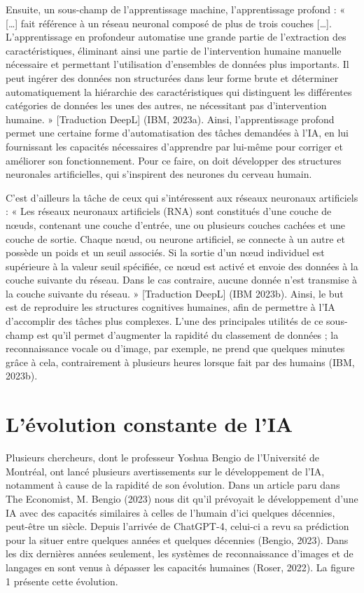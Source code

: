 \documentclass[
  letterpaper,
  DIV=11,
  numbers=noendperiod]{scrreprt}
\begin{document}
Ensuite, un sous-champ de l'apprentissage machine, l'apprentissage
profond : « {[}\ldots{]} fait référence à un réseau neuronal composé de
plus de trois couches {[}\ldots{]}. L'apprentissage en profondeur
automatise une grande partie de l'extraction des caractéristiques,
éliminant ainsi une partie de l'intervention humaine manuelle nécessaire
et permettant l'utilisation d'ensembles de données plus importants. Il
peut ingérer des données non structurées dans leur forme brute et
déterminer automatiquement la hiérarchie des caractéristiques qui
distinguent les différentes catégories de données les unes des autres,
ne nécessitant pas d'intervention humaine. » {[}Traduction DeepL{]}
(IBM, 2023a). Ainsi, l'apprentissage profond permet une certaine forme
d'automatisation des tâches demandées à l'IA, en lui fournissant les
capacités nécessaires d'apprendre par lui-même pour corriger et
améliorer son fonctionnement. Pour ce faire, on doit développer des
structures neuronales artificielles, qui s'inspirent des neurones du
cerveau humain.

C'est d'ailleurs la tâche de ceux qui s'intéressent aux réseaux
neuronaux artificiels : « Les réseaux neuronaux artificiels (RNA) sont
constitués d'une couche de nœuds, contenant une couche d'entrée, une ou
plusieurs couches cachées et une couche de sortie. Chaque nœud, ou
neurone artificiel, se connecte à un autre et possède un poids et un
seuil associés. Si la sortie d'un nœud individuel est supérieure à la
valeur seuil spécifiée, ce nœud est activé et envoie des données à la
couche suivante du réseau. Dans le cas contraire, aucune donnée n'est
transmise à la couche suivante du réseau. » {[}Traduction DeepL{]} (IBM
2023b). Ainsi, le but est de reproduire les structures cognitives
humaines, afin de permettre à l'IA d'accomplir des tâches plus
complexes. L'une des principales utilités de ce sous-champ est qu'il
permet d'augmenter la rapidité du classement de données ; la
reconnaissance vocale ou d'image, par exemple, ne prend que quelques
minutes grâce à cela, contrairement à plusieurs heures lorsque fait par
des humains (IBM, 2023b).

\hypertarget{luxe9volution-constante-de-lia}{%
\section{L'évolution constante de
l'IA}\label{luxe9volution-constante-de-lia}}

Plusieurs chercheurs, dont le professeur Yoshua Bengio de l'Université
de Montréal, ont lancé plusieurs avertissements sur le développement de
l'IA, notamment à cause de la rapidité de son évolution. Dans un article
paru dans The Economist, M. Bengio (2023) nous dit qu'il prévoyait le
développement d'une IA avec des capacités similaires à celles de
l'humain d'ici quelques décennies, peut-être un siècle. Depuis l'arrivée
de ChatGPT-4, celui-ci a revu sa prédiction pour la situer entre
quelques années et quelques décennies (Bengio, 2023). Dans les dix
dernières années seulement, les systèmes de reconnaissance d'images et
de langages en sont venus à dépasser les capacités humaines (Roser,
2022). La figure 1 présente cette évolution.
\end{document}
